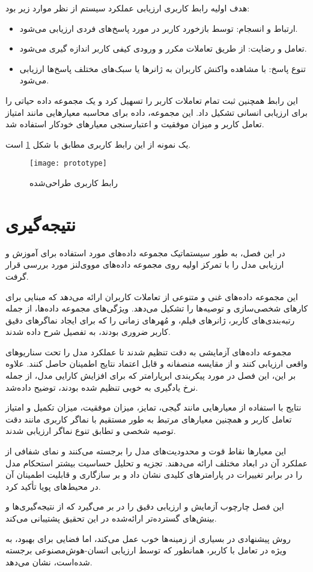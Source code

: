 هدف اولیه رابط کاربری ارزیابی عملکرد سیستم از نظر موارد زیر بود:
\begin{itemize}
\item
 ارتباط و انسجام: توسط بازخورد کاربر در مورد پاسخ‌های فردی ارزیابی می‌شود.
\item
 تعامل و رضایت: از طریق تعاملات مکرر و ورودی کیفی کاربر اندازه گیری می‌شود.
\item
 تنوع پاسخ: با مشاهده واکنش کاربران به ژانرها یا سبک‌های مختلف پاسخ‌ها ارزیابی می‌شود.
\end{itemize}

این رابط همچنین ثبت تمام تعاملات کاربر را تسهیل کرد و یک مجموعه داده حیاتی را برای ارزیابی انسانی تشکیل داد. این مجموعه، داده برای محاسبه معیارهایی مانند امتیاز تعامل کاربر و میزان موفقیت و اعتبارسنجی معیارهای خودکار استفاده شد.

یک نمونه از این رابط کاربری مطابق با شکل%
\ref{fig:MindMeldUi}
 است.

\begin{figure}[ht]
	\centerline{\texttt{[image: prototype]}}
	\caption{رابط کاربری طراحی‌شده}
	\label{fig:MindMeldUi}
\end{figure}



\section{نتیجه‌گیری}

در این فصل، به طور سیستماتیک مجموعه داده‌های مورد استفاده برای آموزش و ارزیابی مدل را با تمرکز اولیه روی مجموعه داده‌های مووی‌لنز مورد بررسی قرار گرفت. 

این مجموعه داده‌های غنی و متنوعی از تعاملات کاربران ارائه می‌دهد که مبنایی برای کارهای شخصی‌سازی و توصیه‌ها را تشکیل می‌دهد. ویژگی‌های مجموعه داده‌ها، از جمله رتبه‌بندی‌های کاربر، ژانرهای فیلم، و مُهرهای زمانی را که برای ایجاد نماگر‌های دقیق کاربر ضروری بودند، به تفصیل شرح داده شدند. 

مجموعه داده‌های آزمایشی به دقت تنظیم شدند تا عملکرد مدل را تحت سناریوهای واقعی ارزیابی کنند و از مقایسه منصفانه و قابل اعتماد نتایج اطمینان حاصل کنند. علاوه بر این، این فصل در مورد پیکربندی ابرپارامتر که برای افزایش کارایی مدل، از جمله نرخ یادگیری به خوبی تنظیم شده بودند، توضیح داده‌شد.

نتایج با استفاده از معیارهایی مانند گیجی، تمایز، میزان موفقیت، میزان تکمیل و امتیاز تعامل کاربر و همچنین معیارهای مرتبط به طور مستقیم با نماگر کاربری مانند دقت توصیه شخصی و تطابق تنوع نماگر ارزیابی شدند. 

این معیارها نقاط قوت و محدودیت‌های مدل را برجسته می‌کنند و نمای شفافی از عملکرد آن در ابعاد مختلف ارائه می‌دهند. تجزیه و تحلیل حساسیت بیشتر استحکام مدل را در برابر تغییرات در پارامترهای کلیدی نشان داد و بر سازگاری و قابلیت اطمینان آن در محیط‌های پویا تأکید کرد. 

این فصل چارچوب آزمایش و ارزیابی دقیق را در بر می‌گیرد که از نتیجه‌گیری‌ها و بینش‌های گسترده‌تر ارائه‌شده در این تحقیق پشتیبانی می‌کند.

 روش پیشنهادی در بسیاری از زمینه‌ها خوب عمل می‌کند، اما فضایی برای بهبود، به ویژه در تعامل با کاربر، همانطور که توسط ارزیابی انسان-هوش‌مصنوعی برجسته شده‌است، نشان می‌دهد.



